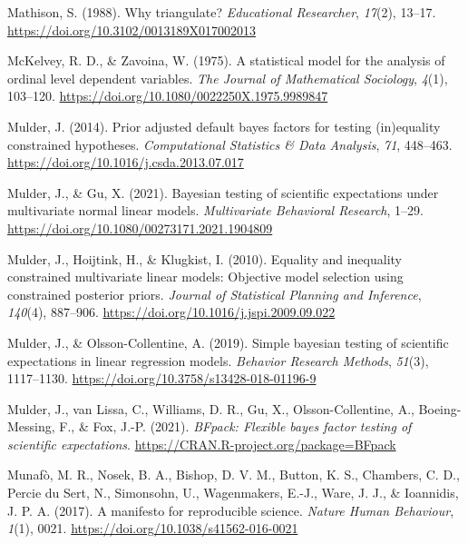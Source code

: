 \documentclass[
]{interact}
\newlength{\cslhangindent}
\newlength{\cslentryspacingunit} %
\newenvironment{CSLReferences}[2] %
    {%
  \setlength{\parindent}{0pt}
  \ifodd #1
  \let\oldpar\par
  \def\par{\hangindent=\cslhangindent\oldpar}
  \fi
  \setlength{\parskip}{#2\cslentryspacingunit}
 }%
 {}
\begin{document}
\begin{CSLReferences}{1}{0}
\leavevmode{}%
Mathison, S. (1988). Why triangulate? \emph{Educational Researcher},
\emph{17}(2), 13--17. \url{https://doi.org/10.3102/0013189X017002013}

\leavevmode{}%
McKelvey, R. D., \& Zavoina, W. (1975). A statistical model for the
analysis of ordinal level dependent variables. \emph{The Journal of
Mathematical Sociology}, \emph{4}(1), 103--120.
\url{https://doi.org/10.1080/0022250X.1975.9989847}

\leavevmode{}%
Mulder, J. (2014). Prior adjusted default bayes factors for testing
(in)equality constrained hypotheses. \emph{Computational Statistics \&
Data Analysis}, \emph{71}, 448--463.
\url{https://doi.org/10.1016/j.csda.2013.07.017}

\leavevmode{}%
Mulder, J., \& Gu, X. (2021). Bayesian testing of scientific
expectations under multivariate normal linear models. \emph{Multivariate
Behavioral Research}, 1--29.
\url{https://doi.org/10.1080/00273171.2021.1904809}

\leavevmode{}%
Mulder, J., Hoijtink, H., \& Klugkist, I. (2010). Equality and
inequality constrained multivariate linear models: Objective model
selection using constrained posterior priors. \emph{Journal of
Statistical Planning and Inference}, \emph{140}(4), 887--906.
\url{https://doi.org/10.1016/j.jspi.2009.09.022}

\leavevmode{}%
Mulder, J., \& Olsson-Collentine, A. (2019). Simple bayesian testing of
scientific expectations in linear regression models. \emph{Behavior
Research Methods}, \emph{51}(3), 1117--1130.
\url{https://doi.org/10.3758/s13428-018-01196-9}

\leavevmode{}%
Mulder, J., van Lissa, C., Williams, D. R., Gu, X., Olsson-Collentine,
A., Boeing-Messing, F., \& Fox, J.-P. (2021). \emph{BFpack: Flexible
bayes factor testing of scientific expectations}.
\url{https://CRAN.R-project.org/package=BFpack}

\leavevmode{}%
Munafò, M. R., Nosek, B. A., Bishop, D. V. M., Button, K. S., Chambers,
C. D., Percie du Sert, N., Simonsohn, U., Wagenmakers, E.-J., Ware, J.
J., \& Ioannidis, J. P. A. (2017). A manifesto for reproducible science.
\emph{Nature Human Behaviour}, \emph{1}(1), 0021.
\url{https://doi.org/10.1038/s41562-016-0021}


\end{CSLReferences}
\end{document}
